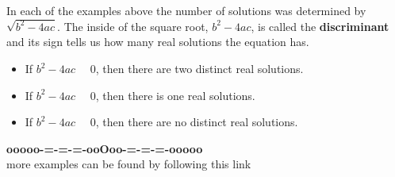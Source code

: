 \documentclass{ximera}
\begin{document}
In each of the examples above the number of solutions was determined by $\sqrt{b^2 - 4 a c}$.  The inside of the square root, $b^2 - 4 a c$, is called the \textbf{discriminant} and its sign tells us how many real solutions the equation has.


\begin{itemize}
\item If $b^2 - 4 a c$ \, \wordChoice{\choice[correct]{$>$}\choice{$=$}\choice{$<$}} \, $0$, then there are two distinct real solutions.
\item If $b^2 - 4 a c$ \, \wordChoice{\choice{$>$}\choice[correct]{$=$}\choice{$<$}} \, $0$, then there is one real solutions.
\item If $b^2 - 4 a c$ \, \wordChoice{\choice{$>$}\choice{$=$}\choice[correct]{$<$}} \, $0$, then there are no distinct real solutions.

\end{itemize}













\begin{center}
\textbf{\textcolor{green!50!black}{ooooo-=-=-=-ooOoo-=-=-=-ooooo}} \\

more examples can be found by following this link\\ 

\end{center}
\end{document}
